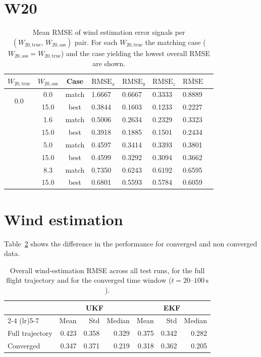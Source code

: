 \section{W20}
\begin{table}[ht]
	\centering
	\begin{tabular}{ccclllll}
		\toprule
		$W_{20,\text{true}}$ & $W_{20,\text{ass}}$ & Case &
		$\text{RMSE}_{x}$ & $\text{RMSE}_{y}$ &
		$\text{RMSE}_{z}$ & $\overline{\text{RMSE}}$ \\
		\midrule
		\multirow{2}{*}{0.0}   & 0.0  & match & 1.6667 & 0.6667 & 0.3333 & 0.8889 \\
		& 15.0 & best  & 0.3844 & 0.1603 & 0.1233 & 0.2227 \\
		\addlinespace
		\multirow{2}{*}{1.6}   & 1.6  & match & 0.5006 & 0.2634 & 0.2329 & 0.3323 \\
		& 15.0 & best  & 0.3918 & 0.1885 & 0.1501 & 0.2434 \\
		\addlinespace
		\multirow{2}{*}{5.0}   & 5.0  & match & 0.4597 & 0.3414 & 0.3393 & 0.3801 \\
		& 15.0 & best  & 0.4599 & 0.3292 & 0.3094 & 0.3662 \\
		\addlinespace
		\multirow{2}{*}{8.3}   & 8.3  & match & 0.7350 & 0.6243 & 0.6192 & 0.6595 \\
		& 15.0 & best  & 0.6801 & 0.5593 & 0.5784 & 0.6059 \\
		\bottomrule
		
	\end{tabular}
	\caption{Mean RMSE of wind estimation error signals per $(W_{20,\text{true}},\, W_{20,\text{ass}})$ pair.
		For each $W_{20,\text{true}}$ the matching case ($W_{20,\text{ass}} = W_{20,\text{true}}$)
		and the case yielding the lowest overall RMSE are shown.}
	\label{tab:rmse_w20}
\end{table}


\section{Wind estimation}

Table~\ref{tab:overall_v2} shows the difference in the performance for converged and non converged data.
\begin{table}[htbp]
	\centering
	\caption{Overall wind-estimation RMSE across all test runs, for the full flight trajectory and for the converged time window ($t = 20$--$100\,\mathrm{s}$).}
	\label{tab:overall_v2}
	\begin{tabular}{lrrrrrr}
		\toprule
		& \multicolumn{3}{c}{UKF} & \multicolumn{3}{c}{EKF} \\
		\cmidrule(lr){2-4} \cmidrule(lr){5-7}
		& Mean & Std & Median & Mean & Std & Median \\
		\midrule
		Full trajectory & 0.423 & 0.358 & 0.329 & 0.375 & 0.342 & 0.282 \\
		Converged        & 0.347 & 0.371 & 0.219 & 0.318 & 0.362 & 0.205 \\
		\bottomrule
	\end{tabular}
\end{table}


